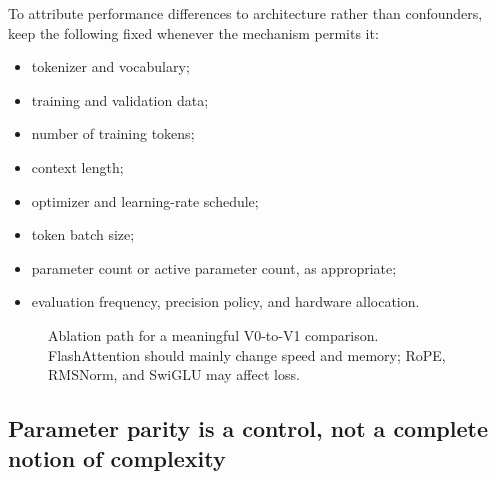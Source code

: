 \documentclass[11pt,a4paper]{article}
\theoremstyle{definition}
\theoremstyle{plain}
\begin{document}
To attribute performance differences to architecture rather than confounders, keep the following fixed whenever the mechanism permits it:
\begin{itemize}[nosep]
    \item tokenizer and vocabulary;
    \item training and validation data;
    \item number of training tokens;
    \item context length;
    \item optimizer and learning-rate schedule;
    \item token batch size;
    \item parameter count or active parameter count, as appropriate;
    \item evaluation frequency, precision policy, and hardware allocation.
\end{itemize}

\begin{figure}[H]
\centering
{}
\caption{Ablation path for a meaningful V0-to-V1 comparison. FlashAttention should mainly change speed and memory; RoPE, RMSNorm, and SwiGLU may affect loss.}
\label{fig:ablation-path}
\end{figure}



\subsection{Parameter parity is a control, not a complete notion of complexity}
\label{sec:param-parity}
\end{document}
